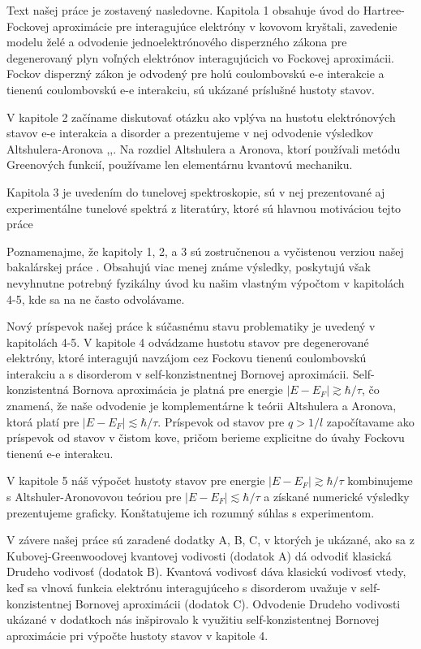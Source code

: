 Text našej práce je zostavený nasledovne. Kapitola 1 obsahuje úvod do Hartree-Fockovej aproximácie pre interagujúce
 elektróny v kovovom kryštali, zavedenie modelu želé a odvodenie jednoelektrónového disperzného zákona pre degenerovaný plyn voľných elektrónov interagujúcich vo Fockovej aproximácii. 
 Fockov disperzný zákon je odvodený pre holú coulombovskú e-e interakcie a tienenú coulombovskú e-e interakciu, sú ukázané príslušné hustoty stavov.
 
 V kapitole 2 začíname diskutovať otázku ako vplýva na hustotu elektrónových stavov e-e interakcia a disorder a prezentujeme v nej odvodenie výsledkov 
 Altshulera-Aronova \cite{Altshuler1},\cite{Altshuler3},\cite{Altshuler4}. 
 Na rozdiel Altshulera a Aronova, ktorí používali metódu Greenových funkcií, používame len elementárnu kvantovú mechaniku.

 Kapitola 3 je uvedením do tunelovej spektroskopie, sú v nej prezentované aj experimentálne tunelové spektrá z literatúry, ktoré sú hlavnou motiváciou tejto práce

Poznamenajme, že kapitoly 1, 2, a 3 sú zostručnenou a vyčistenou verziou našej bakalárskej práce \cite{Bakalarka}. Obsahujú viac menej známe výsledky, poskytujú však nevyhnutne potrebný fyzikálny úvod ku našim
vlastným výpočtom v kapitolách 4-5, kde sa na ne často odvolávame.

Nový príspevok našej práce k súčasnému stavu problematiky je uvedený v kapitolách 4-5. V kapitole 4 odvádzame hustotu stavov pre degenerované elektróny, ktoré interagujú navzájom cez Fockovu tienenú coulombovskú interakciu
a s disorderom v self-konzistnentnej Bornovej aproximácii. Self-konzistentná Bornova aproximácia je platná pre energie $|E-E_F| \gtrsim \hbar/\tau $, čo znamená, že naše odvodenie je komplementárne k teórii Altshulera a Aronova, ktorá platí pre $|E-E_F| \lesssim \hbar/\tau $. Príspevok od stavov pre $q > 1/l$  započítavame
ako príspevok od stavov v čistom kove, pričom berieme explicitne do úvahy Fockovu tienenú e-e interakcu.

V kapitole 5 náš výpočet hustoty stavov pre energie $|E-E_F|  \gtrsim \hbar/\tau$ kombinujeme s Altshuler-Aronovovou teóriou pre $|E-E_F|  \lesssim \hbar/\tau$ a získané
numerické výsledky prezentujeme graficky. Konštatujeme ich rozumný súhlas s experimentom.

V závere našej práce sú zaradené dodatky A, B, C, v ktorých je ukázané, ako sa z Kubovej-Greenwoodovej kvantovej vodivosti (dodatok A) dá odvodiť klasická Drudeho vodivosť (dodatok B).
Kvantová vodivosť dáva klasickú vodivosť vtedy, keď sa vlnová funkcia elektrónu interagujúceho s disorderom uvažuje v self-konzistentnej Bornovej aproximácii (dodatok C).
Odvodenie Drudeho vodivosti ukázané v dodatkoch  nás inšpirovalo k využitiu self-konzistentnej Bornovej aproximácie pri výpočte hustoty stavov v kapitole 4.